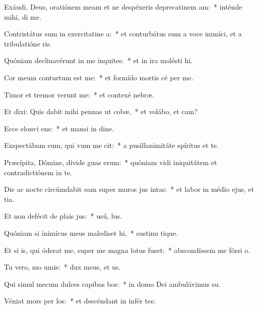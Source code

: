 \item Exáudi, Deus, oratiónem meam et ne despéxeris deprecatinem am:~* inténde mihi,  di me.
\item Contristátus sum in exercitatine a:~* et conturbátus sum a voce inimíci, et a tribulatióne ris.
\item Quóniam declinavérunt in me inquites:~* et in ira molésti  hi.
\item Cor meum conturtum est  me:~* et formído mortis cé per me.
\item Timor et tremor verunt  me:~* et contexé  nebræ.
\item Et dixi: Quis dabit mihi pennas ut cobæ,~* et volábo, et cam?
\item Ecce elonvi ens:~* et mansi in dine.
\item Exspectábam eum, qui vum me cit:~* a pusillanimitáte spíritus et te.
\item Præcípita, Dómine, dívide guas erum:~* quóniam vidi iniquitátem et contradictiónem in te.
\item Die ac nocte circúmdabit eam super muros jus intas:~* et labor in médio ejus, et tia.
\item Et non defécit de plais jus:~* usú,  lus.
\item Quóniam si inimícus meus malediset hi,~* sustinu tique.
\item Et si is, qui óderat me, super me magna lotus fuset:~* abscondíssem me fórsi  o.
\item Tu vero, mo umis:~* dux meus, et  us.
\item Qui simul mecum dulces capibas bos:~* in domo Dei ambulávimus  su.
\item Véniat mors per los:~* et descéndant in infér tes:
